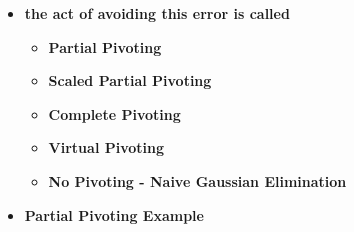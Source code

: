 \documentclass[11pt]{article}
\newcommand{\K}{\color{black}}
\newcommand{\PR}{\color{mypurple}}
\begin{document}
\begin{itemize}
\begin{itemize}
	\item \textbf{the act of avoiding this error is called  \PR {} \K}\\
	\begin{itemize}
		\item \textbf{Partial Pivoting}\vspace{8mm}\\ 
		\item \textbf{Scaled Partial Pivoting}\vspace{8mm}\\ 
		\item \textbf{Complete Pivoting}\vspace{8mm}\\ 
		\item \textbf{Virtual Pivoting}\vspace{8mm}\\ 
		\item \textbf{No Pivoting - Naive Gaussian Elimination}
	\end{itemize}
	
	
	\item \textbf{Partial Pivoting Example}\\
	\vspace{100mm}
	\end{itemize}
	

\end{itemize}
\end{document}
